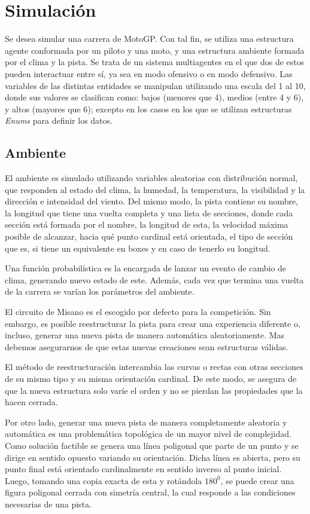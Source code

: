 \documentclass[12pt, letterpaper,spanish]{article}
\theoremstyle{definition}
\theoremstyle{remark}
\begin{document}
\section{Simulación {\footnotesize \cite{conferenciasS}\cite{garcia}}}
	Se desea simular una carrera de MotoGP. Con tal fin, se utiliza una estructura agente conformada por un piloto y una moto, y una estructura ambiente formada por el clima y la pista. Se trata de un sistema multiagentes en el que dos de estos pueden interactuar entre sí, ya sea en modo ofensivo o en modo defensivo. Las variables de las distintas entidades se manipulan utilizando una escala del 1 al 10, donde sus valores se clasifican como: bajos (menores que 4), medios (entre 4 y 6), y altos (mayores que 6); excepto en los casos en los que se utilizan estructuras \emph{Enums} para definir los datos.
	
	\subsection{Ambiente}
		El ambiente es simulado utilizando variables aleatorias con distribución normal, que responden al estado del clima, la humedad, la temperatura, la visibilidad y la dirección e intensidad del viento. Del mismo modo, la pista contiene su nombre, la longitud que tiene una vuelta completa y una lista de secciones, donde cada sección está formada por el nombre, la longitud de esta, la velocidad máxima posible de alcanzar, hacia qué punto cardinal está orientada, el tipo de sección que es, si tiene un equivalente en boxes y en caso de tenerlo su longitud.
		
		Una función probabilística es la encargada de lanzar un evento de cambio de clima, generando nuevo estado de este. Además, cada vez que termina una vuelta de la carrera se varían los parámetros del ambiente.

		El circuito de Misano es el escogido por defecto para la competición. Sin embargo, es posible reestructurar la pista para crear una experiencia diferente o, incluso, generar una nueva pista de manera automática aleatoriamente. Mas debemos asegurarnos de que estas nuevas creaciones sean estructuras válidas.

		El método de reestructuración intercambia las curvas o rectas con otras secciones de su mismo tipo y su misma orientación cardinal. De este modo, se asegura de que la nueva estructura solo varíe el orden y no se pierdan las propiedades que la hacen cerrada.

		Por otro lado, generar una nueva pista de manera completamente aleatoria y automática es una problemática topológica de un mayor nivel de complejidad. Como solución factible se genera una línea poligonal que parte de un punto y se dirige en sentido opuesto variando su orientación. Dicha línea es abierta, pero su punto final está orientado cardinalmente en sentido inverso al punto inicial. Luego, tomando una copia exacta de esta y rotándola $180^0$, se puede crear una  figura poligonal cerrada con simetría central, la cual responde a las condiciones necesarias de una pista.
\end{document}
